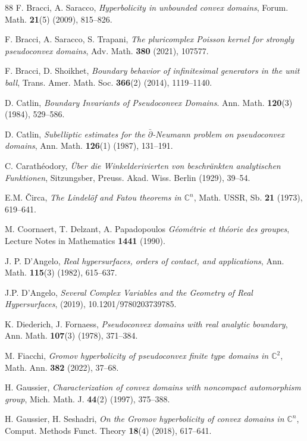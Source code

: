 \documentclass[11pt, reqno]{amsart}
\numberwithin{equation}{section}
\theoremstyle{definition}
\newcommand{\C}{\mathbb{C}}
\begin{document}
{{{\begin{thebibliography}{88}
		 F. Bracci, A. Saracco, {\sl Hyperbolicity in unbounded convex domains}, Forum. Math. {\bf 21}(5) (2009), 815--826.
		
		 F. Bracci, A. Saracco, S. Trapani, {\sl The pluricomplex Poisson kernel for strongly pseudoconvex domains}, Adv. Math. {\bf 380} (2021), 107577.
		
		 F. Bracci, D. Shoikhet, {\sl Boundary behavior of infinitesimal generators in the unit ball},  Trans. Amer. Math. Soc. {\bf 366}(2) (2014), 1119--1140.
		
		 D. Catlin, {\sl Boundary Invariants of Pseudoconvex Domains}. Ann.  Math. {\bf 120}(3) (1984),  529--586.
		
		 D. Catlin, {\sl Subelliptic estimates for the $\bar\partial$-Neumann problem on pseudoconvex domains}, Ann. Math. {\bf 126}(1) (1987), 131--191.
		
		  C. Carath\'eodory, {\sl \"Uber die Winkelderivierten von beschr\"ankten analytischen Funktionen}, Sitzungsber, Preuss. Akad. Wiss. Berlin (1929), 39--54.
		
		
		 E.M. \v{C}irca, {\sl The Lindel\"of and Fatou theorems in $\C^n$}, Math. USSR, Sb. {\bf 21} (1973), 619--641.
		
		 M. Coornaert, T. Delzant, A. Papadopoulos {\sl G\'eom\'etrie et th\'eorie des groupes}, Lecture Notes in Mathematics {\bf 1441} (1990).
		
		 J. P. D'Angelo, {\sl Real hypersurfaces, orders of contact, and applications}, Ann. Math. {\bf 115}(3) (1982), 615--637.
		
		 J.P. D'Angelo, {\sl Several Complex Variables and the Geometry of Real Hypersurfaces}, (2019), 10.1201/9780203739785. 
		
		 K. Diederich, J. Fornaess, {\sl Pseudoconvex domains with real analytic boundary}, Ann. Math. {\bf 107}(3) (1978), 371--384.
		
		 M. Fiacchi, {\sl Gromov hyperbolicity of pseudoconvex finite type domains in $\mathbb{C}^2$}, Math. Ann. {\bf 382} (2022), 37--68.
		
		 H. Gaussier, {\sl Characterization of convex domains with noncompact automorphism group}, Mich. Math. J. {\bf 44}(2) (1997), 375--388.
		
		  H. Gaussier, H. Seshadri, {\sl On the Gromov hyperbolicity of convex domains in $\C^n$}, Comput. Methods Funct. Theory {\bf 18}(4) (2018), 617--641.
		

\end{thebibliography}}}}
\end{document}

